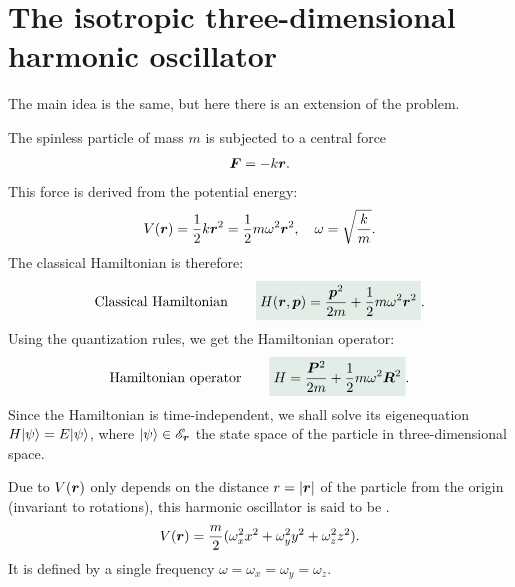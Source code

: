 \section{The isotropic three-dimensional harmonic oscillator}
The main idea is the same, but here there is an extension of the problem.

The spinless particle of mass $m$ is subjected to a central force 
\begin{align}
    \bm{F}=-k\bm{r}.
\end{align}
This force is derived from the potential energy:
\begin{align}
    V(\bm{r})=\frac{1}{2}k\bm{r}^2=\frac{1}{2}m\omega^2\bm{r}^2,\quad\omega=\sqrt{\frac{k}{m}}.
\end{align}
The classical Hamiltonian is therefore:
\begin{align}
    \text{Classical Hamiltonian}\qquad\highlight{H(\bR,\bp)=\frac{\bp^2}{2m}+\frac{1}{2}m\omega^2\bR^2}.
\end{align}
Using the quantization rules, we get the Hamiltonian operator:
\begin{align}
    \text{Hamiltonian operator}\qquad\highlight{H=\frac{\BP^2}{2m}+\frac{1}{2}m\omega^2\BR^2}.
\end{align}
Since the Hamiltonian is time-independent, we shall solve its eigenequation $H|\psi\rangle=E|\psi\rangle$, where $|\psi\rangle\in\mathscr{E}_{\bm{r}}$ the state space 
of the particle in three-dimensional space.

\begin{emphasizer}
    Due to $V(\bm{r})$ only depends on the distance $r=|\bm{r}|$ of the particle from the origin (invariant to rotations), 
    this harmonic oscillator is said to be . 
    \begin{align}
        V(\bm{r})=\frac{m}{2}(\omega^2_xx^2+\omega^2_yy^2+\omega^2_zz^2).
    \end{align}
    It is defined by a single frequency $\omega=\omega_x=\omega_y=\omega_z$.
\end{emphasizer}
